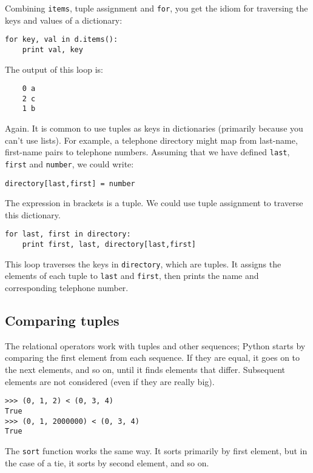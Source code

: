\documentclass{article}
\begin{document}
Combining \verb|items|, tuple assignment and \verb|for|,
you get the idiom for traversing the keys and values of a dictionary:
\begin{verbatim}
for key, val in d.items():
    print val, key
\end{verbatim}
The output of this loop is:
\begin{verbatim}
    0 a
    2 c
    1 b
\end{verbatim}
Again.
It is common to use tuples as keys in dictionaries (primarily
because you can’t use lists). For example, a telephone directory
might map from last-name, first-name pairs to telephone numbers.
Assuming that we have defined \verb|last|, \verb|first| and
\verb|number|, we could write:
\begin{verbatim}
directory[last,first] = number
\end{verbatim}
The expression in brackets is a tuple. We could use tuple assignment
to traverse this dictionary.
\begin{verbatim}
for last, first in directory:
    print first, last, directory[last,first]
\end{verbatim}
This loop traverses the keys in \verb|directory|, which are tuples. It
assigns the elements of each tuple to \verb|last| and \verb|first|,
then prints the name and corresponding telephone number.
\subsection{Comparing tuples}
The relational operators work with tuples and other sequences; Python
starts by comparing the first element from each sequence. If they are
equal, it goes on to the next elements, and so on, until it finds
elements that differ. Subsequent elements are not considered (even if
they are really big).
\begin{verbatim}
>>> (0, 1, 2) < (0, 3, 4)
True
>>> (0, 1, 2000000) < (0, 3, 4)
True
\end{verbatim}
The \verb|sort| function works the same way. It sorts primarily by first
element, but in the case of a tie, it sorts by second element, and so
on.
\end{document}
